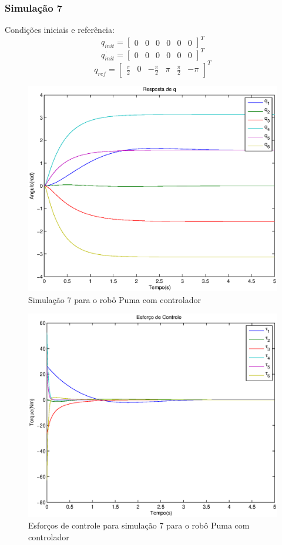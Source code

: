 \documentclass{article}
\begin{document}
\subsubsection{Simulação 7}
Condições iniciais e referência:
\begin{equation}
\label{eq:sim7q}
q_{init}=\begin{bmatrix}
0 & 0 & 0 & 0 & 0 & 0
\end{bmatrix}^T
\end{equation}
\begin{equation}
\label{eq:sim7qd}
\dot{q_{init}}=\begin{bmatrix}
0 & 0 & 0 & 0 & 0 & 0
\end{bmatrix}^T
\end{equation}
\begin{equation}
\label{eq:sim7qr}
q_{ref}=\begin{bmatrix}
\frac{\pi}{2} & 0 & -\frac{\pi}{2} & \pi & \frac{\pi}{2} & -\pi
\end{bmatrix}^T
\end{equation}

\begin{figure}[H]
	\centering
	\includegraphics[width=0.8\linewidth]{../sim1cl}
	\caption{Simulação 7 para o robô Puma com controlador}
	\label{fig:pumasim7}
\end{figure}

\begin{figure}[H]
	\centering
	\includegraphics[width=0.8\linewidth]{../sim1clu}
	\caption{Esforços de controle para simulação 7 para o robô Puma com controlador}
	\label{fig:pumasim7clu}
\end{figure}
\end{document}

